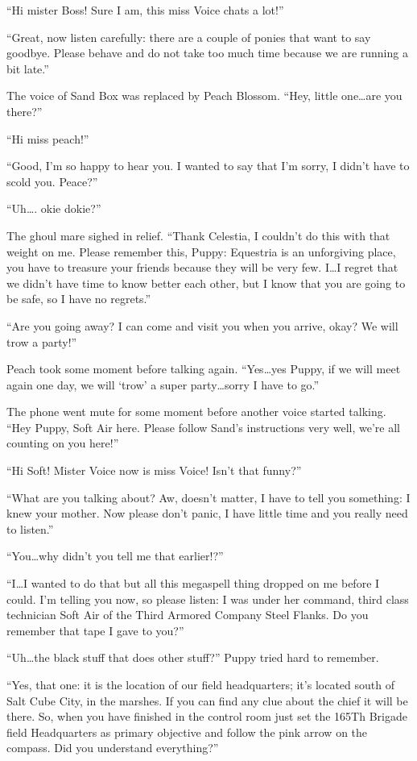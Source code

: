 ``Hi mister Boss! Sure I am, this miss Voice chats a lot!''

``Great, now listen carefully: there are a couple of ponies that want to say goodbye. Please behave and do not take too much time because we are running a bit late.''

The voice of Sand Box was replaced by Peach Blossom. ``Hey, little one\dots are you there?''

``Hi miss peach!''

``Good, I'm so happy to hear you. I wanted to say that I'm sorry, I didn't have to scold you. Peace?''

``Uh\dots. okie dokie?''

The ghoul mare sighed in relief. ``Thank Celestia, I couldn't do this with that weight on me. Please remember this, Puppy: Equestria is an unforgiving place, you have to treasure your friends because they will be very few. I\dots I regret that we didn't have time to know better each other, but I know that you are going to be safe, so I have no regrets.''

``Are you going away? I can come and visit you when you arrive, okay? We will trow a party!''

Peach took some moment before talking again. ``Yes\dots yes Puppy, if we will meet again one day, we will `trow' a super party\dots sorry I have to go.''

The phone went mute for some moment before another voice started talking. ``Hey Puppy, Soft Air here. Please follow Sand's instructions very well, we're all counting on you here!''

``Hi Soft! Mister Voice now is miss Voice! Isn't that funny?''

``What are you talking about? Aw, doesn't matter, I have to tell you something: I knew your mother. Now please don't panic, I have little time and you really need to listen.''

``You\dots why didn't you tell me that earlier!?''

``I\dots I wanted to do that but all this megaspell thing dropped on me before I could. I'm telling you now, so please listen: I was under her command, third class technician Soft Air of the Third Armored Company Steel Flanks. Do you remember that tape I gave to you?''

``Uh\dots the black stuff that does other stuff?'' Puppy tried hard to remember.

``Yes, that one: it is the location of our field headquarters; it's located south of Salt Cube City, in the marshes. If you can find any clue about the chief it will be there. So, when you have finished in the control room just set the 165Th Brigade field Headquarters as primary objective and follow the pink arrow on the compass. Did you understand everything?''

